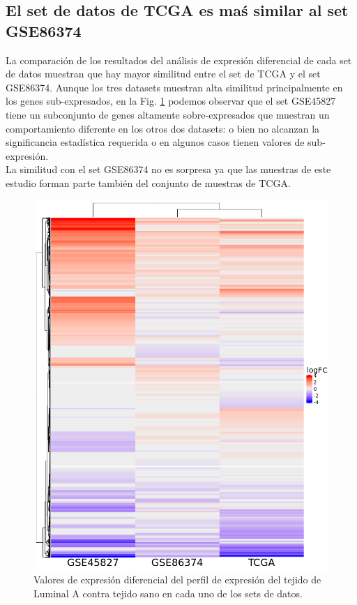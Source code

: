 \documentclass{article}
\begin{document}
\subsection*{El set de datos de TCGA es maś similar al set GSE86374}
La comparación de los resultados del análisis de expresión diferencial de cada set de datos muestran que hay mayor similitud entre el set de TCGA y el set GSE86374. Aunque los tres datasets muestran alta similitud principalmente en los genes sub-expresados, en la Fig. \ref{fig:heatmap} podemos observar que el set GSE45827 tiene un subconjunto de genes altamente sobre-expresados que muestran un comportamiento diferente en los otros dos datasets: o bien no alcanzan la significancia estadística requerida o en algunos casos tienen valores de sub-expresión. \\
La similitud con el set GSE86374 no es sorpresa ya que las muestras de este estudio forman parte también del conjunto de muestras de TCGA. 

\begin{figure}
\centering
\includegraphics[scale=0.4]{../figures/heatmap.png}
\caption{Valores de expresión diferencial del perfil de expresión del tejido de Luminal A contra tejido sano en cada uno de los sets de datos.}
\label{fig:heatmap}
\end{figure}
\end{document}
